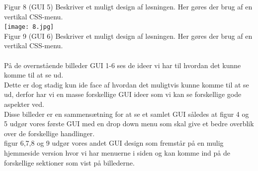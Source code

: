 \documentclass[a4paper]{article}
\begin{document}
Figur 8 (GUI 5) Beskriver et muligt design af løsningen. Her gøres der brug af en vertikal CSS-menu.\\
\texttt{[image: 8.jpg]}\\
Figur 9 (GUI 6) Beskriver et muligt design af løsningen. Her gøres der brug af en vertikal CSS-menu.\\\\
På de overnstående billeder GUI 1-6 ses de ideer vi har til hvordan det kunne komme til at se ud.\\
Dette er dog stadig kun ide face af hvordan det muligtvis kunne komme til at se ud, derfor har vi en masse forskellige GUI ideer som vi kan se forskellige gode aspekter ved.\\
Disse billeder er en sammensætning for at se et samlet GUI således at figur 4 og 5 udgør vores første GUI med en drop down menu som skal give et bedre overblik over de forskellige handlinger.\\
figur 6,7,8 og 9 udgør vores andet GUI design som fremstår på en mulig hjemmeside version hvor vi har menuerne i siden og kan komme ind på de forskellige sektioner som vist på billederne.
\pagebreak
\end{document}
